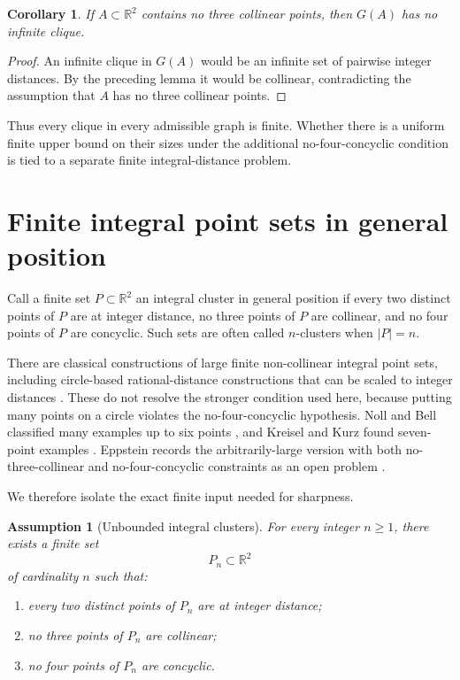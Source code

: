 \documentclass[11pt]{article}
\newtheorem{corollary}{Corollary}
\newtheorem{assumption}{Assumption}
\newcommand{\R}{\mathbb R}
\begin{document}
\begin{corollary}
If \(A\subset \R^2\) contains no three collinear points, then \(G(A)\) has no infinite clique.
\end{corollary}

\begin{proof}
An infinite clique in \(G(A)\) would be an infinite set of pairwise integer distances. By the preceding lemma it would be collinear, contradicting the assumption that \(A\) has no three collinear points.
\end{proof}

Thus every clique in every admissible graph is finite. Whether there is a uniform finite upper bound on their sizes under the additional no-four-concyclic condition is tied to a separate finite integral-distance problem.

\section{Finite integral point sets in general position}

Call a finite set \(P\subset\R^2\) an integral cluster in general position if every two distinct points of \(P\) are at integer distance, no three points of \(P\) are collinear, and no four points of \(P\) are concyclic. Such sets are often called \(n\)-clusters when \(|P|=n\).

There are classical constructions of large finite non-collinear integral point sets, including circle-based rational-distance constructions that can be scaled to integer distances \cite{Harborth1998}. These do not resolve the stronger condition used here, because putting many points on a circle violates the no-four-concyclic hypothesis. Noll and Bell classified many examples up to six points \cite{NollBell1989}, and Kreisel and Kurz found seven-point examples \cite{KreiselKurz2008}. Eppstein records the arbitrarily-large version with both no-three-collinear and no-four-concyclic constraints as an open problem \cite[Example~4]{Eppstein2026}.

We therefore isolate the exact finite input needed for sharpness.

\begin{assumption}[Unbounded integral clusters]\label{assumption:unbounded-clusters}
For every integer \(n\geq 1\), there exists a finite set
\[
P_n\subset \R^2
\]
of cardinality \(n\) such that:
\begin{enumerate}
    \item every two distinct points of \(P_n\) are at integer distance;
    \item no three points of \(P_n\) are collinear;
    \item no four points of \(P_n\) are concyclic.
\end{enumerate}
\end{assumption}
\end{document}
